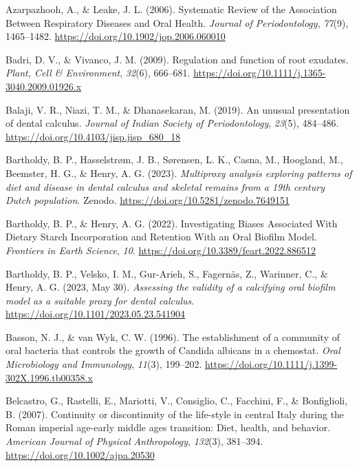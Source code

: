 \documentclass[
  letterpaper,
]{book}
\newlength{\cslhangindent}
\newlength{\cslentryspacingunit} %
\newenvironment{CSLReferences}[2] %
 {%
  \setlength{\parindent}{0pt}
  \ifodd #1
  \let\oldpar\par
  \def\par{\hangindent=\cslhangindent\oldpar}
  \fi
  \setlength{\parskip}{#2\cslentryspacingunit}
 }%
 {}
\begin{document}
\begin{CSLReferences}{1}{0}
\leavevmode{}%
Azarpazhooh, A., \& Leake, J. L. (2006). Systematic {Review} of the
{Association Between Respiratory Diseases} and {Oral Health}.
\emph{Journal of Periodontology}, \emph{77}(9), 1465--1482.
\url{https://doi.org/10.1902/jop.2006.060010}

\leavevmode{}%
Badri, D. V., \& Vivanco, J. M. (2009). Regulation and function of root
exudates. \emph{Plant, Cell \& Environment}, \emph{32}(6), 666--681.
\url{https://doi.org/10.1111/j.1365-3040.2009.01926.x}

\leavevmode{}%
Balaji, V. R., Niazi, T. M., \& Dhanasekaran, M. (2019). An unusual
presentation of dental calculus. \emph{Journal of Indian Society of
Periodontology}, \emph{23}(5), 484--486.
\url{https://doi.org/10.4103/jisp.jisp_680_18}

\leavevmode{}%
Bartholdy, B. P., Hasselstrøm, J. B., Sørensen, L. K., Casna, M.,
Hoogland, M., Beemster, H. G., \& Henry, A. G. (2023). \emph{Multiproxy
analysis exploring patterns of diet and disease in dental calculus and
skeletal remains from a 19th century {Dutch} population}. {Zenodo}.
\url{https://doi.org/10.5281/zenodo.7649151}

\leavevmode{}%
Bartholdy, B. P., \& Henry, A. G. (2022). Investigating {Biases
Associated With Dietary Starch Incorporation} and {Retention With} an
{Oral Biofilm Model}. \emph{Frontiers in Earth Science}, \emph{10}.
\url{https://doi.org/10.3389/feart.2022.886512}

\leavevmode{}%
Bartholdy, B. P., Velsko, I. M., Gur-Arieh, S., Fagernäs, Z., Warinner,
C., \& Henry, A. G. (2023, May 30). \emph{Assessing the validity of a
calcifying oral biofilm model as a suitable proxy for dental calculus}.
\url{https://doi.org/10.1101/2023.05.23.541904}

\leavevmode{}%
Basson, N. J., \& van Wyk, C. W. (1996). The establishment of a
community of oral bacteria that controls the growth of {Candida}
albicans in a chemostat. \emph{Oral Microbiology and Immunology},
\emph{11}(3), 199--202.
\url{https://doi.org/10.1111/j.1399-302X.1996.tb00358.x}

\leavevmode{}%
Belcastro, G., Rastelli, E., Mariotti, V., Consiglio, C., Facchini, F.,
\& Bonfiglioli, B. (2007). Continuity or discontinuity of the life-style
in central {Italy} during the {Roman} imperial age-early middle ages
transition: {Diet}, health, and behavior. \emph{American Journal of
Physical Anthropology}, \emph{132}(3), 381--394.
\url{https://doi.org/10.1002/ajpa.20530}


\end{CSLReferences}
\end{document}
